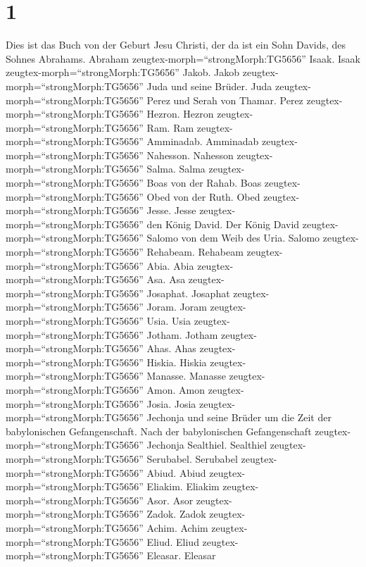 \hypertarget{section}{%
\section{1}\label{section}}

 Dies ist das Buch von der Geburt Jesu Christi, der da ist
ein Sohn Davids, des Sohnes Abrahams.  Abraham
zeugtex-morph=``strongMorph:TG5656'' Isaak. Isaak
zeugtex-morph=``strongMorph:TG5656'' Jakob. Jakob
zeugtex-morph=``strongMorph:TG5656'' Juda und seine Brüder. 
Juda zeugtex-morph=``strongMorph:TG5656'' Perez und Serah von Thamar.
Perez zeugtex-morph=``strongMorph:TG5656'' Hezron. Hezron
zeugtex-morph=``strongMorph:TG5656'' Ram.  Ram
zeugtex-morph=``strongMorph:TG5656'' Amminadab. Amminadab
zeugtex-morph=``strongMorph:TG5656'' Nahesson. Nahesson
zeugtex-morph=``strongMorph:TG5656'' Salma.  Salma
zeugtex-morph=``strongMorph:TG5656'' Boas von der Rahab. Boas
zeugtex-morph=``strongMorph:TG5656'' Obed von der Ruth. Obed
zeugtex-morph=``strongMorph:TG5656'' Jesse.  Jesse
zeugtex-morph=``strongMorph:TG5656'' den König David. Der König David
zeugtex-morph=``strongMorph:TG5656'' Salomo von dem Weib des Uria.
 Salomo zeugtex-morph=``strongMorph:TG5656'' Rehabeam.
Rehabeam zeugtex-morph=``strongMorph:TG5656'' Abia. Abia
zeugtex-morph=``strongMorph:TG5656'' Asa.  Asa
zeugtex-morph=``strongMorph:TG5656'' Josaphat. Josaphat
zeugtex-morph=``strongMorph:TG5656'' Joram. Joram
zeugtex-morph=``strongMorph:TG5656'' Usia.  Usia
zeugtex-morph=``strongMorph:TG5656'' Jotham. Jotham
zeugtex-morph=``strongMorph:TG5656'' Ahas. Ahas
zeugtex-morph=``strongMorph:TG5656'' Hiskia.  Hiskia
zeugtex-morph=``strongMorph:TG5656'' Manasse. Manasse
zeugtex-morph=``strongMorph:TG5656'' Amon. Amon
zeugtex-morph=``strongMorph:TG5656'' Josia.  Josia
zeugtex-morph=``strongMorph:TG5656'' Jechonja und seine Brüder um die
Zeit der babylonischen Gefangenschaft.  Nach der
babylonischen Gefangenschaft zeugtex-morph=``strongMorph:TG5656''
Jechonja Sealthiel. Sealthiel zeugtex-morph=``strongMorph:TG5656''
Serubabel.  Serubabel zeugtex-morph=``strongMorph:TG5656''
Abiud. Abiud zeugtex-morph=``strongMorph:TG5656'' Eliakim. Eliakim
zeugtex-morph=``strongMorph:TG5656'' Asor.  Asor
zeugtex-morph=``strongMorph:TG5656'' Zadok. Zadok
zeugtex-morph=``strongMorph:TG5656'' Achim. Achim
zeugtex-morph=``strongMorph:TG5656'' Eliud.  Eliud
zeugtex-morph=``strongMorph:TG5656'' Eleasar. Eleasar
